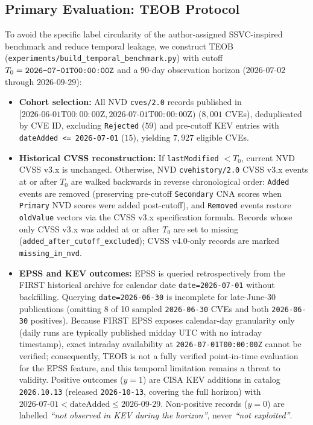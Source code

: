\documentclass[conference]{IEEEtran}
\begin{document}
\subsection{Primary Evaluation: TEOB Protocol}
\label{sec:teob_method}
To avoid the specific label circularity of the author-assigned SSVC-inspired benchmark and reduce temporal leakage, we construct TEOB (\texttt{experiments/build\_temporal\_benchmark.py}) with cutoff $T_0 = \text{\texttt{2026-07-01T00:00:00Z}}$ and a 90-day observation horizon ($2026\text{-}07\text{-}02$ through $2026\text{-}09\text{-}29$):
\begin{itemize}
    \item \textbf{Cohort selection:} All NVD \texttt{cves/2.0} records published in $[2026\text{-}06\text{-}01\text{T}00:00:00\text{Z}, 2026\text{-}07\text{-}01\text{T}00:00:00\text{Z})$ ($8,001$ CVEs), deduplicated by CVE ID, excluding \texttt{Rejected} ($59$) and pre-cutoff KEV entries with \texttt{dateAdded <= 2026-07-01} ($15$), yielding $7,927$ eligible CVEs.
    \item \textbf{Historical CVSS reconstruction:} If \texttt{lastModified} $< T_0$, current NVD CVSS v3.x is unchanged. Otherwise, NVD \texttt{cvehistory/2.0} CVSS v3.x events at or after $T_0$ are walked backwards in reverse chronological order: \texttt{Added} events are removed (preserving pre-cutoff \texttt{Secondary} CNA scores when \texttt{Primary} NVD scores were added post-cutoff), and \texttt{Removed} events restore \texttt{oldValue} vectors via the CVSS v3.x specification formula. Records whose only CVSS v3.x was added at or after $T_0$ are set to missing (\texttt{added\_after\_cutoff\_excluded}); CVSS v4.0-only records are marked \texttt{missing\_in\_nvd}.
    \item \textbf{EPSS and KEV outcomes:} EPSS is queried retrospectively from the FIRST historical archive for calendar date \texttt{date=2026-07-01} without backfilling. Querying \texttt{date=2026-06-30} is incomplete for late-June-30 publications (omitting 8 of 10 sampled \texttt{2026-06-30} CVEs and both \texttt{2026-06-30} positives). Because FIRST EPSS exposes calendar-day granularity only (daily runs are typically published midday UTC with no intraday timestamp), exact intraday availability at \texttt{2026-07-01T00:00:00Z} cannot be verified; consequently, TEOB is not a fully verified point-in-time evaluation for the EPSS feature, and this temporal limitation remains a threat to validity. Positive outcomes ($y=1$) are CISA KEV additions in catalog \texttt{2026.10.13} (released \texttt{2026-10-13}, covering the full horizon) with $2026\text{-}07\text{-}01 < \text{dateAdded} \le 2026\text{-}09\text{-}29$. Non-positive records ($y=0$) are labelled \emph{``not observed in KEV during the horizon''}, never \emph{``not exploited''}.

\end{itemize}
\end{document}
